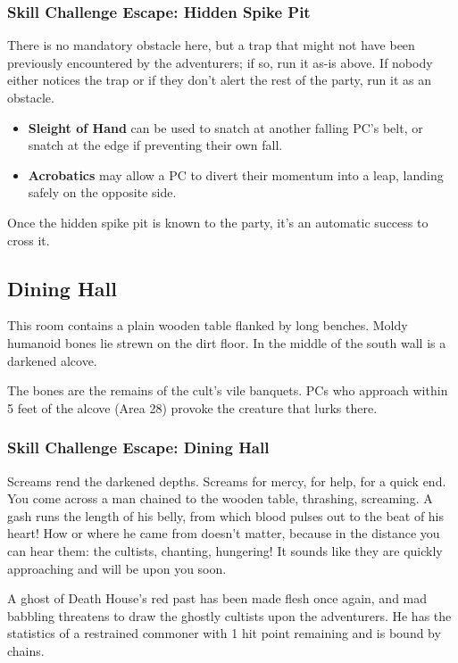 \subsubsection*{Skill Challenge Escape: Hidden Spike Pit}
\label{sec:SC_HiddenSpikePit}
There is no mandatory obstacle here, but a trap that might not have been previously encountered by the
adventurers; if so, run it as-is above. If nobody either notices the trap or if they don't alert the rest of
the party, run it as an obstacle.
\begin{skillChallenge}
  \begin{itemize}
    \item \textbf{Sleight of Hand} can be used to snatch at another falling PC's belt, or snatch at the edge
    if preventing their own fall. \easyDC
    \item \textbf{Acrobatics} may allow a PC to divert their momentum into a leap, landing safely on the opposite
    side. \moderateDC
  \end{itemize}
\end{skillChallenge}
Once the hidden spike pit is known to the party, it's an automatic success to cross it.


\pagebreak
\subsection{Dining Hall}
\label{sec:DiningHall}
\begin{readout}
  This room contains a plain wooden table flanked by long benches. Moldy humanoid bones lie strewn on the dirt
  floor. In the middle of the south wall is a darkened alcove.
\end{readout}
The bones are the remains of the cult's vile banquets. PCs who approach within 5 feet of the alcove (Area 28)
provoke the creature that lurks there.

\begin{arealinks}
\end{arealinks}

\subsubsection*{Skill Challenge Escape: Dining Hall}
\label{sec:SC_DiningHall}
\begin{readout}
  Screams rend the darkened depths. Screams for mercy, for help, for a quick end. You come across a man chained
  to the wooden table, thrashing, screaming. A gash runs the length of his belly, from which blood pulses out to
  the beat of his heart! How or where he came from doesn't matter, because in the distance you can hear them:
  the cultists, chanting, hungering! It sounds like they are quickly approaching and will be upon you soon.
\end{readout}
A ghost of Death House's red past has been made flesh once again, and mad babbling threatens to draw the
ghostly cultists upon the adventurers. He has the statistics of a restrained commoner with 1 hit point remaining
and is bound by chains.

